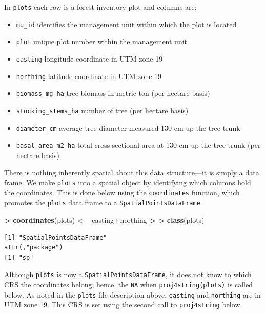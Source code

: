 \documentclass[]{krantz}
\makeatletter
\newenvironment{Shaded}{\begin{snugshade}}{\end{snugshade}}
\newcommand{\ErrorTok}[1]{\textcolor[rgb]{0.14,0.14,0.14}{\textbf{#1}}}
\newcommand{\KeywordTok}[1]{\textcolor[rgb]{0.27,0.27,0.27}{\textbf{#1}}}
\newcommand{\NormalTok}[1]{#1}
\newcommand{\OperatorTok}[1]{\textcolor[rgb]{0.43,0.43,0.43}{\textbf{#1}}}
\newcommand{\StringTok}[1]{\textcolor[rgb]{0.5,0.5,0.5}{#1}}
\providecommand{\tightlist}{%
  \setlength{\itemsep}{0pt}\setlength{\parskip}{0pt}}
\newenvironment{kframe}{%
\medskip{}
\setlength{\fboxsep}{.8em}
 \def\at@end@of@kframe{}%
 \ifinner\ifhmode%
  \def\at@end@of@kframe{\end{minipage}}%
  \begin{minipage}{\columnwidth}%
 \fi\fi%
 \def\FrameCommand##1{\hskip\@totalleftmargin \hskip-\fboxsep
 \colorbox{shadecolor}{##1}\hskip-\fboxsep
     \hskip-\linewidth \hskip-\@totalleftmargin \hskip\columnwidth}%
 \MakeFramed {\advance\hsize-\width
   \@totalleftmargin\z@ \linewidth\hsize
   \@setminipage}}%
 {\par\unskip\endMakeFramed%
 \at@end@of@kframe}
\renewenvironment{Shaded}{\begin{kframe}}{\end{kframe}}
\makeatother
\begin{document}
In \texttt{plots} each row is a forest inventory plot and columns are:

\begin{itemize}
\tightlist
\item
  \texttt{mu\_id} identifies the management unit within which the plot is located
\item
  \texttt{plot} unique plot number within the management unit
\item
  \texttt{easting} longitude coordinate in UTM zone 19
\item
  \texttt{northing} latitude coordinate in UTM zone 19
\item
  \texttt{biomass\_mg\_ha} tree biomass in metric ton (per hectare basis)
\item
  \texttt{stocking\_stems\_ha} number of tree (per hectare basis)
\item
  \texttt{diameter\_cm} average tree diameter measured 130 cm up the tree trunk
\item
  \texttt{basal\_area\_m2\_ha} total cross-sectional area at 130 cm up the tree trunk (per hectare basis)
\end{itemize}

There is nothing inherently spatial about this data structure---it is simply a data frame. We make \texttt{plots} into a spatial object by identifying which columns hold the coordinates. This is done below using the \texttt{coordinates} function, which promotes the \texttt{plots} data frame to a \texttt{SpatialPointsDataFrame}.

\begin{Shaded}
\begin{Highlighting}[]
\OperatorTok{>}\StringTok{ }\KeywordTok{coordinates}\NormalTok{(plots) <-}\StringTok{ }\ErrorTok{~}\NormalTok{easting}\OperatorTok{+}\NormalTok{northing}
\OperatorTok{>}\StringTok{ }
\ErrorTok{>}\StringTok{ }\KeywordTok{class}\NormalTok{(plots)}
\end{Highlighting}
\end{Shaded}

\begin{verbatim}
[1] "SpatialPointsDataFrame"
attr(,"package")
[1] "sp"
\end{verbatim}

Although \texttt{plots} is now a \texttt{SpatialPointsDataFrame}, it does not know to which CRS the coordinates belong; hence, the \texttt{NA} when \texttt{proj4string(plots)} is called below. As noted in the \texttt{plots} file description above, \texttt{easting} and \texttt{northing} are in UTM zone 19. This CRS is set using the second call to \texttt{proj4string} below.
\end{document}
